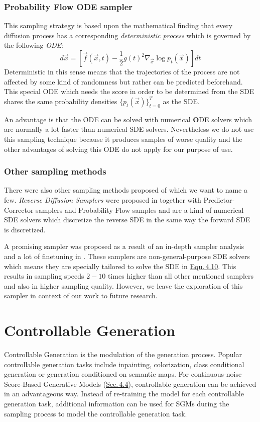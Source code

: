 \subsubsection{Probability Flow ODE sampler}
%
This sampling strategy is based upon the mathematical finding that every diffusion process has a corresponding \textit{deterministic process} which is governed by the following \textit{ODE}:
%
\begin{equation} \label{equ:4.21}
    d\vec{x}=\left[\vec{f}(\vec{x},t)-\frac{1}{2}g(t)^2\nabla_{\vec{x}}\log p_t(\vec{x})\right]dt
\end{equation}
%
Deterministic in this sense means that the trajectories of the process are not affected by some kind of randomness but rather can be predicted beforehand. This special ODE which needs the score in order to be determined from the SDE shares the same probability densities $\{p_t(\vec{x})\}_{t=0}^T$ as the SDE. 

An advantage is that the ODE can be solved with numerical \textbf{O}DE solvers which are normally a lot faster than numerical SDE solvers. Nevertheless we do not use this sampling technique because it produces samples of worse quality \cite{score_3} and the other advantages of solving this ODE do not apply for our purpose of use.
%
\subsubsection{Other sampling methods}
%
There were also other sampling methods proposed of which we want to name a few. \textit{Reverse Diffusion Samplers} were proposed in \cite{score_3} together with Predictor-Corrector samplers and Probability Flow samples and are a kind of numerical SDE solvers which discretize the reverse SDE in the same way the forward SDE is discretized.

A promising sampler was proposed as a result of an in-depth sampler analysis and a lot of finetuning in \cite{gotta_go_fast}. These samplers are non-general-purpose SDE solvers which means they are specially tailored to solve the SDE in \hyperref[equ:4.10]{Equ.\,4.10}. This results in sampling speeds $2-10$ times higher than all other mentioned samplers and also in higher sampling quality. However, we leave the exploration of this sampler in context of our work to future research.

\section{Controllable Generation} \label{sec:4.5}
Controllable Generation is the modulation of the generation process. Popular controllable generation tasks include inpainting, colorization, class conditional generation or generation conditioned on semantic maps. For continuous-noise Score-Based Generative Models (\hyperref[sec:4.4]{Sec.\,4.4}), controllable generation can be achieved in an advantageous way. Instead of re-training the model for each controllable generation task, additional information can be used for SGMs during the sampling process to model the controllable generation task.

